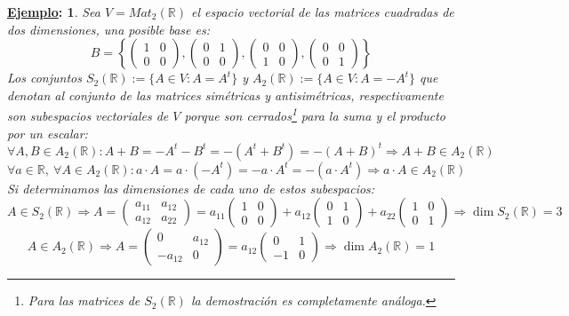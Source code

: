 \documentclass[10pt,a4paper,openright]{book}
\theoremstyle{break}
\newtheorem*{ej}{\underline{Ejemplo}:}
\begin{document}
\begin{ej}
Sea $V=Mat_2(\mathbb R)$ el espacio vectorial de las matrices cuadradas de dos dimensiones, una posible base es:
$$
B=\left\lbrace
\left(\begin{array}{cc}1&0\\ 0&0\end{array}\right),\left(\begin{array}{cc}0&1\\ 0&0\end{array}\right),
\left(\begin{array}{cc}0&0\\ 1&0\end{array}\right),
\left(\begin{array}{cc}0&0\\ 0&1\end{array}\right)
\right\rbrace
$$
Los conjuntos $S_2(\mathbb{R}) := \{A\in V : A=A^t\}$ y $A_2(\mathbb R) := \{A\in V : A = -A^t\}$ que denotan al conjunto de las matrices simétricas y antisimétricas, respectivamente son subespacios vectoriales de $V$ porque son cerrados\footnote{Para las matrices de $S_2(\mathbb{R})$ la demostración es completamente análoga.} para la suma y el producto por un escalar:
$$
\forall A,B\in A_2(\mathbb R) :  A+B=-A^t-B^t=-(A^t+B^t)=-(A+B)^t \Rightarrow A+B\in A_2(\mathbb R)$$
$$\forall a\in \mathbb R, \ \forall A\in A_2(\mathbb R) : a\cdot A=a\cdot (-A^t)=-a\cdot A^t=-(a\cdot A^t) \Rightarrow a\cdot A \in A_2(\mathbb R)
$$
Si determinamos las dimensiones de cada uno de estos subespacios:
$$
A\in S_2(\mathbb{R}) \Rightarrow A=\left(\begin{array}{cc}a_{11}&a_{12}\\ a_{12}&a_{22}\end{array}\right)= a_{11}\left(\begin{array}{cc}1&0\\ 0&0\end{array}\right)+ a_{12}\left(\begin{array}{cc}0&1\\ 1&0\end{array}\right)+a_{22} \left(\begin{array}{cc}1&0\\ 0&1\end{array}\right)\Rightarrow \dim S_2(\mathbb R)=3
$$
$$
A\in A_2(\mathbb{R}) \Rightarrow A=\left(\begin{array}{cc}0&a_{12}\\ -a_{12}&0\end{array}\right)=a_{12}\left(\begin{array}{cc}0&1\\ -1&0\end{array}\right)\Rightarrow \dim A_2(\mathbb R)=1
$$
\end{ej}
\end{document}
